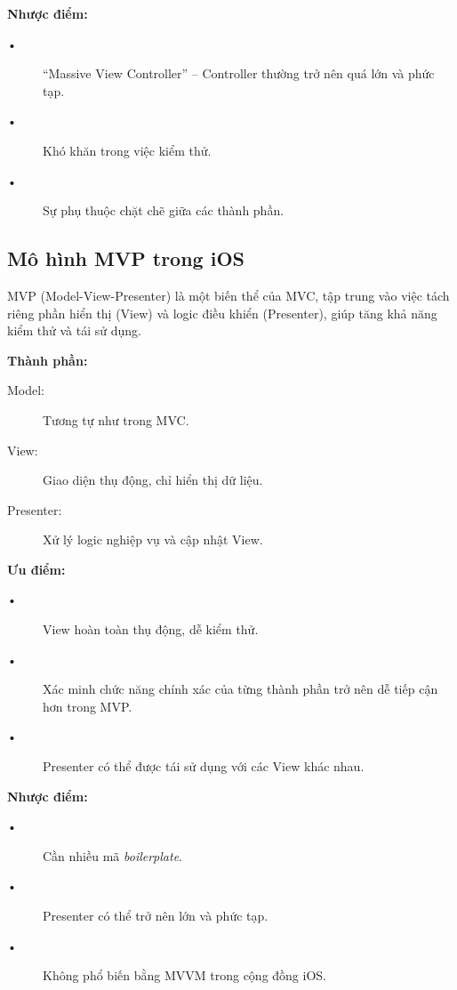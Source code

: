     \vspace{1em}
    \textbf{Nhược điểm:}
    \begin{description}
      \item[•] ``Massive View Controller'' – Controller thường trở nên quá lớn và phức tạp.
      \item[•] Khó khăn trong việc kiểm thử.
      \item[•] Sự phụ thuộc chặt chẽ giữa các thành phần.
    \end{description}
    \subsection{Mô hình MVP trong iOS}

    MVP (Model-View-Presenter) là một biến thể của MVC, tập trung vào việc tách riêng phần hiển thị (View) và logic điều khiển (Presenter), giúp tăng khả năng kiểm thử và tái sử dụng.
    
    \vspace{1em}
    \textbf{Thành phần:}
    \begin{description}
      \item[Model:] Tương tự như trong MVC.
      \item[View:] Giao diện thụ động, chỉ hiển thị dữ liệu.
      \item[Presenter:] Xử lý logic nghiệp vụ và cập nhật View.
    \end{description}
    
    \vspace{1em}
    \textbf{Ưu điểm:}
    \begin{description}
      \item[•] View hoàn toàn thụ động, dễ kiểm thử.
      \item[•] Xác minh chức năng chính xác của từng thành phần trở nên dễ tiếp cận hơn trong MVP.
      \item[•] Presenter có thể được tái sử dụng với các View khác nhau.
    \end{description}
    
    \vspace{1em}
    \textbf{Nhược điểm:}
    \begin{description}
      \item[•] Cần nhiều mã \textit{boilerplate}.
      \item[•] Presenter có thể trở nên lớn và phức tạp.
      \item[•] Không phổ biến bằng MVVM trong cộng đồng iOS.
    \end{description}
    

